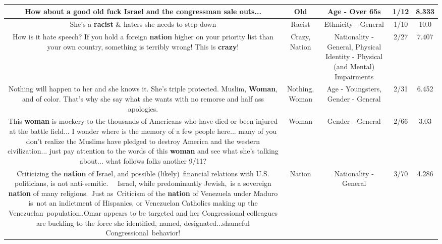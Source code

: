 \documentclass[11pt]{article}
\newlength\mylength
\begin{document}
\begin{center}
\begin{longtable}{|C{.65\mylength}|C{.30\mylength}|C{.12\mylength}|C{.12\mylength}|C{.12\mylength}|}
  \small How about a good \textbf{old} fuck Israel and the congressman sale outs...\normalsize   & Old & Age - Over 65s & 1/12 & 8.333 \\  \hline
  \small She's a \textbf{racist} \& haters she needs to step down\normalsize   & Racist & Ethnicity - General & 1/10 & 10.0 \\  \hline
  \small How is it hate speech? If you hold a foreign \textbf{nation} higher on your priority list than your own country, something is terribly wrong! This is \textbf{crazy}!\normalsize   & Crazy, Nation & Nationality - General, Physical Identity - Physical (and Mental) Impairments & 2/27 & 7.407 \\  \hline
  \small Nothing will happen to her and she knows it.  She's triple protected. Muslim, \textbf{Woman}, and of color. That's why she say what she wants with no remorse and half ass apologies.\normalsize   & Nothing, Woman & Age - Youngsters, Gender - General & 2/31 & 6.452 \\  \hline
  \small This \textbf{woman} is mockery to the thousands of Americans who have died or been injured at the battle field... I wonder where is the memory of a few people here... many of you don't realize the Muslims have pledged to destroy America and the western civilization... just pay attention to the words of this \textbf{woman} and see what she's talking about... what follows folks another 9/11?\normalsize   & Woman & Gender - General & 2/66 & 3.03 \\  \hline
  \small Criticizing the \textbf{nation} of Israel, and possible (likely) financial relations with U.S. politicians, is not anti-semitic.   Israel, while predominantly Jewish, is a sovereign \textbf{nation} of many religions. Just as Criticism of the \textbf{nation} of Venezuela under Maduro is not an indictment of Hispanics, or Venezuelan Catholics making up the Venezuelan population..Omar appears to be targeted and her Congressional colleagues are buckling to the force she identified, named, designated...shameful Congressional behavior!\normalsize   & Nation & Nationality - General & 3/70 & 4.286 \\  \hline

\end{longtable}
\end{center}
\end{document}
